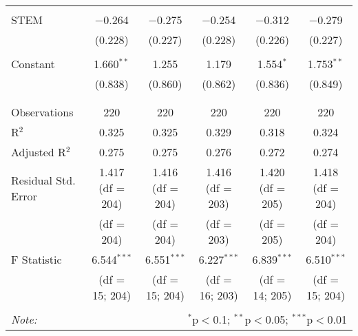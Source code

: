 \begin{table}[H]
\begin{adjustbox}{width=\textwidth, totalheight=\baselineskip}
\begin{tabular}{@{\extracolsep{5pt}}lccccc}
  & & & & & \\ 
 STEM & $-$0.264 & $-$0.275 & $-$0.254 & $-$0.312 & $-$0.279 \\ 
  & (0.228) & (0.227) & (0.228) & (0.226) & (0.227) \\ 
  & & & & & \\ 
 Constant & 1.660$^{**}$ & 1.255 & 1.179 & 1.554$^{*}$ & 1.753$^{**}$ \\ 
  & (0.838) & (0.860) & (0.862) & (0.836) & (0.849) \\ 
  & & & & & \\ 
\hline \\[-1.8ex] 
Observations & 220 & 220 & 220 & 220 & 220 \\ 
R$^{2}$ & 0.325 & 0.325 & 0.329 & 0.318 & 0.324 \\ 
Adjusted R$^{2}$ & 0.275 & 0.275 & 0.276 & 0.272 & 0.274 \\ 
Residual Std. Error & 1.417 (df = 204) & 1.416 (df = 204) & 1.416 (df = 203) & 1.420 (df = 205) & 1.418 (df = 204) \\ 
&  (df = 204) &  (df = 204) &  (df = 203) &  (df = 205) &  (df = 204) \\
F Statistic & 6.544$^{***}$  & 6.551$^{***}$  & 6.227$^{***}$  & 6.839$^{***}$  & 6.510$^{***}$  \\ 
&  (df = 15; 204) &  (df = 15; 204) &  (df = 16; 203) &  (df = 14; 205) &  (df = 15; 204) \\
\hline 
\hline \\[-1.8ex] 
\textit{Note:}  & \multicolumn{5}{r}{$^{*}$p$<$0.1; $^{**}$p$<$0.05; $^{***}$p$<$0.01} \\ 
\end{tabular} 
\end{adjustbox}
\end{table} 
     

  


